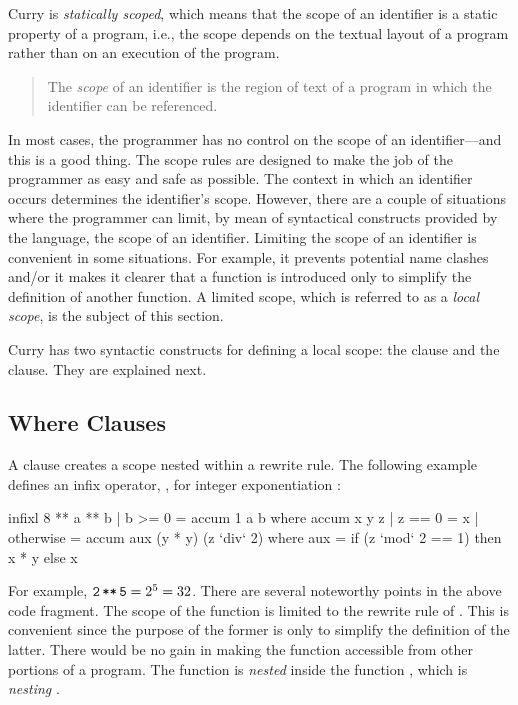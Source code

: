 Curry is \emph{statically scoped},
which means that the scope of an
identifier is a static property of a program, i.e.,
the scope depends on the textual layout of a program rather than on
an execution of the program.
%
\begin{quote}
The \emph{scope} of an identifier is the region of text
of a program in which the identifier can be referenced.
\end{quote}
%
In most cases, the programmer has no control on the scope of
an identifier---and this is a good thing.
The scope rules are designed to make the job of the programmer
as easy and safe as possible.
The context in which an identifier occurs determines the
identifier's scope.
However, there are a couple of situations where the programmer
can limit, by mean of syntactical constructs provided by the language,
the scope of an identifier.
Limiting the scope of an identifier is convenient in some situations.
For example, it prevents potential name clashes
and/or it makes it clearer that a function is
introduced only to simplify the definition of another function.
A limited scope,
which is referred to as a \emph{local scope},
is the subject of this section.

Curry has two syntactic constructs 
for defining a local scope: the  clause
and the  clause.
They are explained next.

\subsection{{\selectfont Where} Clauses}
\label{where-clause}

A 
clause creates a scope nested within a rewrite rule.
The following example defines an infix operator, \ccode{**}, for
integer exponentiation
:
%
\begin{prog}
infixl 8 **
a ** b | b >= 0 = accum 1 a b
   where accum x y z | z == 0    = x
                     | otherwise = accum aux (y * y) (z `div` 2)
           where aux = if (z `mod` 2 == 1) then x * y else x
\end{prog}
%
For example, $\code{2\,**\,5}=2^5=32$.
There are several noteworthy points in the above code fragment.
The scope of the function  is limited to
the rewrite rule of \ccode{**}.
This is convenient since the purpose of the former
is only to simplify the definition of the latter.
There would be no gain in making the function 
accessible from other portions of a program.
The function  is \emph{nested}
inside the function \ccode{**}, which is \emph{nesting} .  

